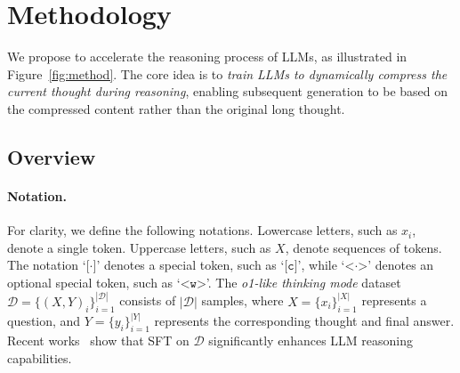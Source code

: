 

\section{Methodology}
We propose \textbf{\ours} to accelerate the reasoning process of LLMs, as illustrated in Figure~\ref{fig:method}.
The core idea is to \textit{train LLMs to dynamically compress the current thought during reasoning}, enabling subsequent generation to be based on the compressed content rather than the original long thought.

\subsection{Overview}

\paragraph{Notation.}
For clarity, we define the following notations.
Lowercase letters, such as $x_i$, denote a single token.
Uppercase letters, such as $X$, denote sequences of tokens.
The notation `$\texttt{[·]}$' denotes a special token, such as `$\texttt{[c]}$', while `$\texttt{<·>}$' denotes an optional special token, such as `$\texttt{<w>}$'.
The \textit{o1-like thinking mode} dataset $\mathcal{D}=\{(X,Y)_i\}_{i=1}^{|\mathcal{D}|}$ consists of $|\mathcal{D}|$ samples, where $X=\{x_i\}_{i=1}^{|X|}$ represents a question, and $Y=\{y_i\}_{i=1}^{|Y|}$ represents the corresponding thought and final answer. 
Recent works~\citep{arxiv25_openthoughts,arxiv25_deepseek_r1} show that SFT on $\mathcal{D}$ significantly enhances LLM reasoning capabilities.

